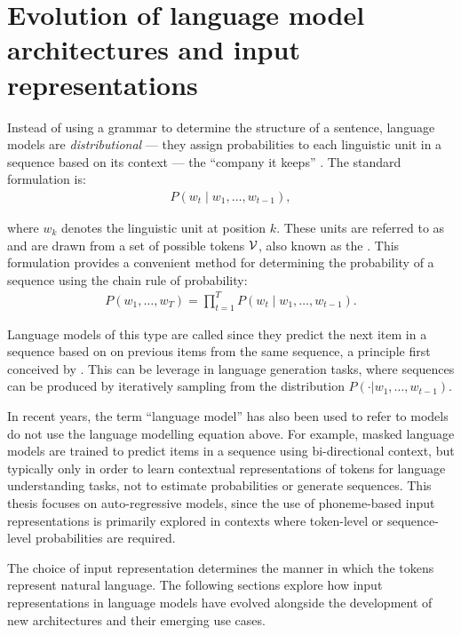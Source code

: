 \section{Evolution of language model architectures and input representations}\label{sec:12-architectures}

Instead of using a grammar to determine the structure of a sentence, language models are \emph{distributional} --- they assign probabilities to each linguistic unit in a sequence based on its context --- the ``company it keeps'' \citep{firth1957synopsis}. The standard formulation is:
\begin{align}
    P\left(w_t \mid w_1, \dots, w_{t-1} \right), \label{eq:languagemodel}
\end{align}

where $w_k$ denotes the linguistic unit at position $k$. These units are referred to as  and are drawn from a set of possible tokens $\mathcal{V}$, also known as the . This formulation provides a convenient method for determining the probability of a sequence using the chain rule of probability:
\begin{align}
    P(w_1, \dots, w_T) = \prod_{t=1}^{T} P\left(w_t \mid w_1, \dots, w_{t-1}\right).
\end{align}


Language models of this type are called  since they predict the next item in a sequence based on on previous items from the same sequence, a principle first conceived by \citet{shannon1948mathematical}. This can be leverage in language generation tasks, where sequences can be produced by iteratively sampling from the distribution $P(\cdot | w_1, \dots, w_{t-1})$.


In recent years, the term ``language model'' has also been used to refer to models do not use the language modelling equation above. For example, masked language models \citep[MLM;][]{devlin2019bert} are trained to predict items in a sequence using bi-directional context, but typically only in order to learn contextual representations of tokens for language understanding tasks, not to estimate probabilities or generate sequences. This thesis focuses on auto-regressive models, since the use of phoneme-based input representations is primarily explored in contexts where token-level or sequence-level probabilities are required.

The choice of input representation determines the manner in which the tokens represent natural language. %
The following sections explore how input representations in language models have evolved alongside the development of new architectures and their emerging use cases.

